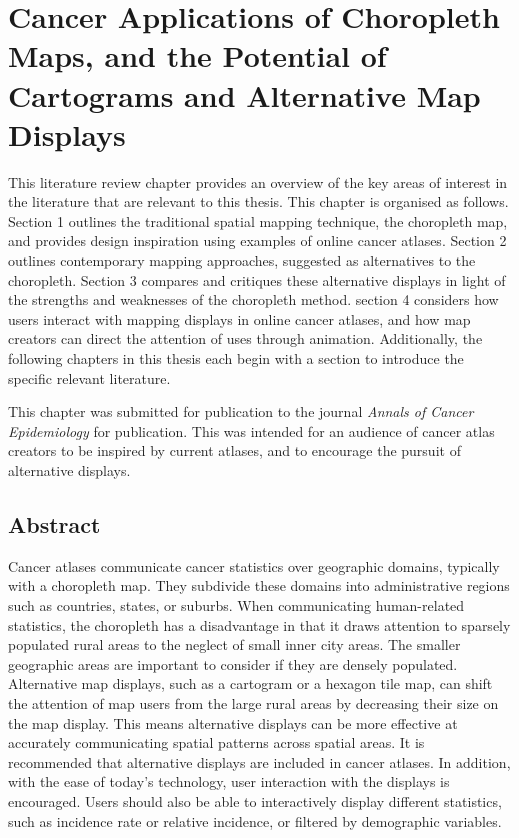 \documentclass{monashthesis}
\begin{document}
\hypertarget{ch:literature}{%
\chapter{Cancer Applications of Choropleth Maps, and the Potential of Cartograms and Alternative Map Displays}\label{ch:literature}}

This literature review chapter provides an overview of the key areas of interest in the literature that are relevant to this thesis. This chapter is organised as follows. Section 1 outlines the traditional spatial mapping technique, the choropleth map, and provides design inspiration using examples of online cancer atlases. Section 2 outlines contemporary mapping approaches, suggested as alternatives to the choropleth. Section 3 compares and critiques these alternative displays in light of the strengths and weaknesses of the choropleth method. section 4 considers how users interact with mapping displays in online cancer atlases, and how map creators can direct the attention of uses through animation. Additionally, the following chapters in this thesis each begin with a section to introduce the specific relevant literature.

This chapter was submitted for publication to the journal \emph{Annals of Cancer Epidemiology} for publication. This was intended for an audience of cancer atlas creators to be inspired by current atlases, and to encourage the pursuit of alternative displays.



\newpage

\hypertarget{abstract-1}{%
\section*{Abstract}\label{abstract-1}}

Cancer atlases communicate cancer statistics over geographic domains, typically with a choropleth map. They subdivide these domains into administrative regions such as countries, states, or suburbs. When communicating human-related statistics, the choropleth has a disadvantage in that it draws attention to sparsely populated rural areas to the neglect of small inner city areas. The smaller geographic areas are important to consider if they are densely populated. Alternative map displays, such as a cartogram or a hexagon tile map, can shift the attention of map users from the large rural areas by decreasing their size on the map display. This means alternative displays can be more effective at accurately communicating spatial patterns across spatial areas. It is recommended that alternative displays are included in cancer atlases. In addition, with the ease of today's technology, user interaction with the displays is encouraged. Users should also be able to interactively display different statistics, such as incidence rate or relative incidence, or filtered by demographic variables.
\end{document}
